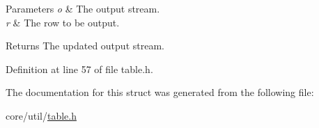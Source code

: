 \begin{DoxyParams}{Parameters}
{\em o} & The output stream. \\
\hline
{\em r} & The row to be output. \\
\hline
\end{DoxyParams}
\begin{DoxyReturn}{Returns}
The updated output stream. 
\end{DoxyReturn}


Definition at line 57 of file table.\+h.



The documentation for this struct was generated from the following file\+:\begin{DoxyCompactItemize}
\item 
core/util/\hyperlink{table_8h}{table.\+h}\end{DoxyCompactItemize}
